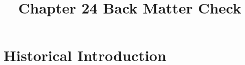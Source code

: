 \documentclass[11pt,a4paper]{article}
\title{Chapter 24 Back Matter Check}
\author{}
\numberwithin{equation}{subsection}
\begin{document}
\maketitle
\setcounter{section}{23}
\section{Historical Introduction}

\end{document}
